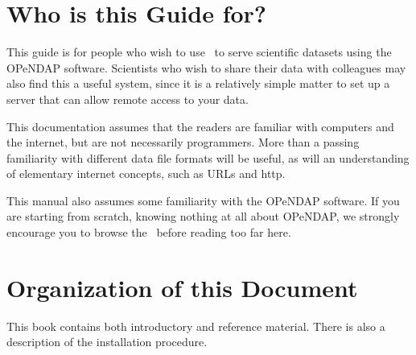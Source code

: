 \section{Who is this Guide for?}
\label{pref,who}

This guide is for people who wish to use \ffnd\ to serve scientific
datasets using the OPeNDAP software.  Scientists who wish to share their
data with colleagues may also find this a useful system, since it is a
relatively simple matter to set up a server that can allow remote
access to your data.

This documentation assumes that the readers are familiar with
computers and the internet, but are not necessarily programmers. More
than a passing familiarity with different data file formats will be
useful, as will an understanding of elementary internet concepts, such
as URLs and http.

This manual also assumes some familiarity with the OPeNDAP software.  If
you are starting from scratch, knowing nothing at all about OPeNDAP, we
strongly encourage you to browse the \DODSuser\ before reading too far
here.  

\section{Organization of this Document}

This book contains both introductory and reference material. There is
also a description of the installation procedure.

